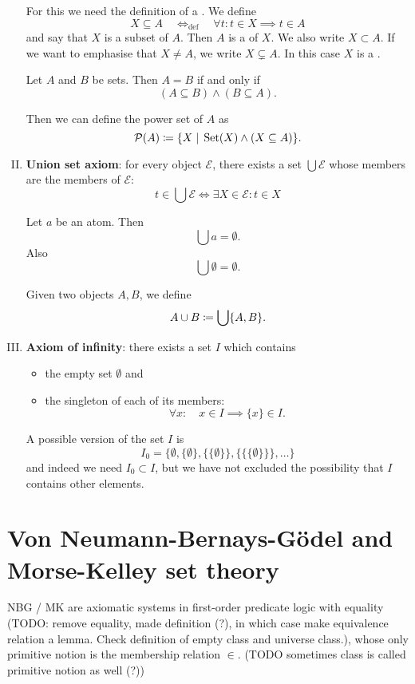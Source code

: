 \begin{enumerate}[(I)]
\begin{note}
For this we need the definition of a . We define
\[ X\subseteq A \quad \Leftrightarrow_\text{def} \quad \forall t:t\in X\implies t\in A  \]
and say that $X$ is a subset of $A$. Then $A$ is a  of $X$. We also write $X\subset A$. If we want to emphasise that $X\neq A$, we write $X\subsetneq A$. In this case $X$ is a .
\begin{lemma}
Let $A$ and $B$ be sets. Then $A = B$ \textup{if and only if}
\[ (A\subseteq B) \land (B\subseteq A). \]
\end{lemma}
\end{note}
Then we can define the power set of $A$ as
\[ \operatorname{\mathcal{P}}(A) \coloneqq \{X \;|\; \operatorname{Set}(X) \land (X\subseteq A)\}. \]
\item \textbf{Union set axiom}: for every object $\mathcal{E}$, there exists a set $\bigcup \mathcal{E}$ whose members are the members of $\mathcal{E}$:
\[ t\in \bigcup\mathcal{E} \iff \exists X\in \mathcal{E}:t\in X \]
\begin{note}
\begin{lemma}
Let $a$ be an atom. Then
\[ \bigcup a = \emptyset. \]
Also
\[ \bigcup \emptyset = \emptyset. \]
\end{lemma}
\end{note}
\begin{note}
Given two objects $A,B$, we define
\[ A\cup B \coloneqq \bigcup \{ A,B \}. \]
\end{note}
\item \textbf{Axiom of infinity}: there exists a set $I$ which contains
\begin{itemize}
\item the empty set $\emptyset$ and
\item the singleton of each of its members:
\[ \forall x: \quad x\in I \implies \{x\}\in I. \]
\end{itemize}
\begin{note}
A possible version of the set $I$ is
\[ I_0 = \{ \emptyset, \{\emptyset\}, \{\{\emptyset\}\}, \{\{\{\emptyset\}\}\}, \ldots \} \]
and indeed we need $I_0\subset I$, but we have not excluded the possibility that $I$ contains other elements.
\end{note}
\end{enumerate}

\section{Von Neumann-Bernays-Gödel and Morse-Kelley set theory}
NBG / MK are axiomatic systems in first-order predicate logic with equality (TODO: remove equality, made definition (?), in which case make equivalence relation a lemma. Check definition of empty class and universe class.), whose only primitive notion is the membership relation $\in$. (TODO sometimes class is called primitive notion as well (?))

